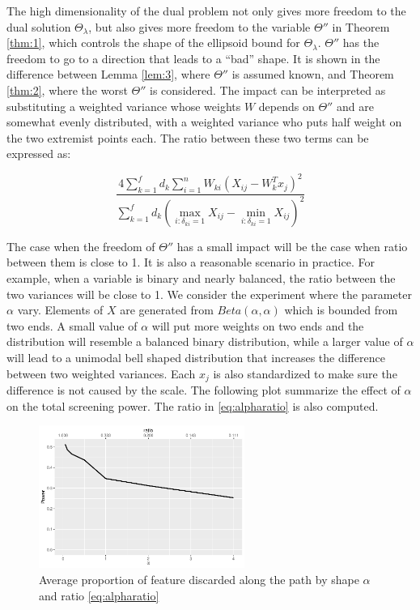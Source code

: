 The high dimensionality of the dual problem not only gives more freedom to the dual solution $\Theta_\lambda$, but also gives more freedom to the variable $\Theta''$ in Theorem \ref{thm:1}, which controls the shape of the ellipsoid bound for $\Theta_\lambda$. $\Theta''$ has the freedom to go to a direction that leads to a ``bad'' shape. It is shown in the difference between Lemma \ref{lem:3}, where $\Theta''$ is assumed known, and Theorem \ref{thm:2}, where the worst $\Theta''$ is considered. The impact can be interpreted as substituting a weighted variance whose weights $W$ depends on $\Theta''$ and are somewhat evenly distributed, with a weighted variance who puts half weight on the two extremist points each. The ratio between these two terms can be expressed as:

\begin{equation}
    \label{eq:alpharatio}
    \frac{4\sum_{k=1}^fd_k\sum_{i=1}^nW_{ki}\left(X_{ij}-W_k^Tx_j\right)^2}{\sum_{k=1}^fd_k\left(\max_{i:\delta_{ki}=1}X_{ij}-\min_{i:\delta_{ki}=1}X_{ij}\right)^2}
\end{equation}

The case when the freedom of $\Theta''$ has a small impact will be the case when ratio between them is close to 1. It is also a reasonable scenario in practice. For example, when a variable is binary and nearly balanced, the ratio between the two variances will be close to 1. We consider the experiment where the parameter $\alpha$ vary. Elements of $X$ are generated from $Beta(\alpha,\alpha)$ which is bounded from two ends. A small value of $\alpha$ will put more weights on two ends and the distribution will resemble a balanced binary distribution, while a larger value of $\alpha$ will lead to a unimodal bell shaped distribution that increases the difference between two weighted variances. Each $x_j$ is also standardized to make sure the difference is not caused by the scale. The following plot summarize the effect of $\alpha$ on the total screening power. The ratio in \eqref{eq:alpharatio} is also computed.

\begin{figure}[ht]
    \centering
    \includegraphics[width=0.6\textwidth]{alpha.pdf}  
    \caption{Average proportion of feature discarded along the path by shape $\alpha$ and ratio \eqref{eq:alpharatio}}
\end{figure}

